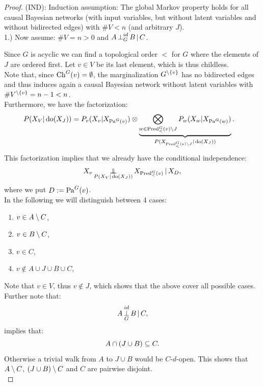 \begin{Thm}
\begin{proof}
(IND): Induction assumption: 
The global Markov property holds for all causal Bayesian networks 
(with input variables, but without latent variables and without bidirected edges) 
with $\#V < n$ (and arbitrary $J$).\\

1.) Now assume: $\#V =n>0$ and $A \operatorname*{\perp}^{id}_G B \operatorname*{|} C$.

Since $G$ is acyclic we can find a topological order $<$ for $G$ where the elements of $J$ are ordered first.  
Let $v \in V$ be its last element, which is thus  childless.  \\
Note that, since $\mathrm{Ch}^G(v) = \emptyset$, the marginalization $G^{\setminus \{v\}}$ has no bidirected edges and thus induces again 
a causal Bayesian network without latent variables with $\#V^{\setminus \{v\}}=n-1 <n$.\\
Furthermore, we have the factorization:
\begin{align*} 
    P(X_V|\operatorname{do}(X_J)) 
        &= P_v(X_v|X_{\mathrm{Pa}^G(v)}) \otimes 
    \underbrace{\bigotimes_{w \in \mathrm{Pred}^G_<(v) \setminus J} P_w(X_w|X_{\mathrm{Pa}^G(w)})}_{P(X_{\mathrm{Pred}_<^G(v) \setminus J}|\operatorname{do}(X_J))}.
\end{align*}
This factorization implies that we already have the conditional independence:
\begin{align*}
    X_v \operatorname*{\perp\mkern-11mu\perp}_{P(X_V|\operatorname{do}(X_J)) } X_{\mathrm{Pred}^G_<(v)} \operatorname*{|} X_D,     \label{eq:pred}
\end{align*}
where we put $D:=\mathrm{Pa}^{G}(v)$.\\

In the following we will distinguish between 4 cases: 
\begin{enumerate}[label = \Alph*.)]
    \item $v \in A \setminus C$,
    \item $v \in B \setminus C$,
    \item $v \in C$,
    \item $ v \notin A \cup J \cup B \cup C$,
\end{enumerate}
Note that $v \in V$, thus $v \notin J$, which shows that the above cover all possible cases.\\
Further note that:
\[A \operatorname*{\perp}^{id}_G  B \operatorname*{|} C,\] 
implies that:
\[ A \cap ( J \cup B) \subseteq C.  \]
Otherwise a trivial walk from $A$ to $J \cup B$ would be $C$-$d$-open. 
This shows that $A\setminus C$, $(J \cup B) \setminus C$ and $C$ are pairwise disjoint.\\



\end{proof}
\end{Thm}
